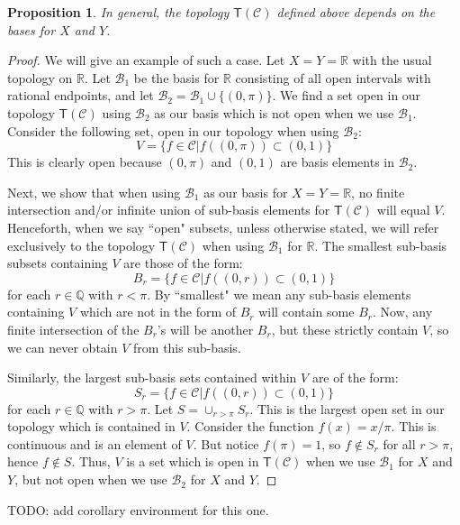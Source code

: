 \documentclass[review]{elsarticle}
\theoremstyle{plain}%
\newtheorem{prop}[thm]{Proposition}
\theoremstyle{definition}
\theoremstyle{remark}
\begin{document}
\begin{prop}
	In general, the topology $\mathsf{T}(\mathcal{C})$ defined above depends on the bases for $X$ and $Y$. 
\end{prop}
\begin{proof}
	We will give an example of such a case. Let $X=Y=\mathbb{R}$ with the usual topology on $\mathbb{R}$. Let $\mathcal{B}_1$ be the basis for $\mathbb{R}$ consisting of all open intervals with rational endpoints, and let $\mathcal{B}_2 = \mathcal{B}_1\cup\{(0,\pi)\}$. We find a set open in our topology $\mathsf{T}(\mathcal{C})$ using $\mathcal{B}_2$ as our basis which is not open when we use $\mathcal{B}_1$. Consider the following set, open in our topology when using $\mathcal{B}_2$:
	$$
	V = \{f\in\mathcal{C}| f((0,\pi))\subset(0,1)\}
	$$
	This is clearly open because $(0,\pi)$ and $(0,1)$ are basis elements in $\mathcal{B}_2$. 
	
	Next, we show that when using $\mathcal{B}_1$ as our basis for $X=Y=\mathbb{R}$, no finite intersection and/or infinite union of sub-basis elements for $\mathsf{T}(\mathcal{C})$ will equal $V$. Henceforth, when we say ``open" subsets, unless otherwise stated, we will refer exclusively to the topology $\mathsf{T}(\mathcal{C})$ when using $\mathcal{B}_1$ for $\mathbb{R}$. The smallest sub-basis subsets containing $V$ are those of the form:
	$$
	B_r = \{f\in\mathcal{C} | f((0,r))\subset(0,1)\}
	$$
	for each $r\in\mathbb{Q}$ with $r<\pi$. By ``smallest" we mean any sub-basis elements containing $V$ which are not in the form of $B_r$ will contain some $B_r$. Now, any finite intersection of the $B_r$'s will be another $B_r$, but these strictly contain $V$, so we can never obtain $V$ from this sub-basis. 
	
	Similarly, the largest sub-basis sets contained within $V$ are of the form: 
	$$
	S_r = \{f\in\mathcal{C} | f((0,r))\subset(0,1)\}
	$$
	for each $r\in \mathbb{Q}$ with $r>\pi$. Let $S = \cup_{r>\pi}S_r$. This is the largest open set in our topology which is contained in $V$. Consider the function $f(x) = x/\pi$. This is continuous and is an element of $V$. But notice $f(\pi)=1$, so $f\notin S_r$ for all $r>\pi$, hence $f\notin S$. Thus, $V$ is a set which is open in $\mathsf{T}(\mathcal{C})$ when we use $\mathcal{B}_1$ for $X$ and $Y$, but not open when we use $\mathcal{B}_2$ for $X$ and $Y$. 
\end{proof}

TODO: add corollary environment for this one. 
\end{document}
